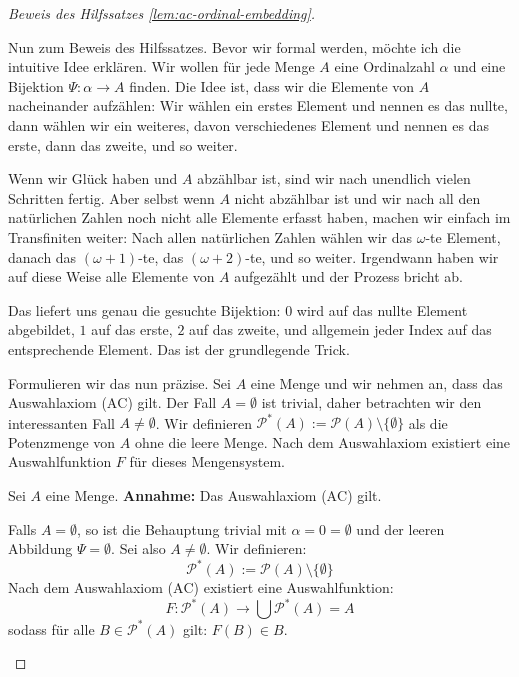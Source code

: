 \begin{proof}[Beweis des Hilfssatzes \ref{lem:ac-ordinal-embedding}]

\begin{spoken-clean}[01:03:41 - 01:05:16]
Nun zum Beweis des Hilfssatzes. Bevor wir formal werden, möchte ich die intuitive Idee erklären. Wir wollen für jede Menge $A$ eine Ordinalzahl $\alpha$ und eine Bijektion $\Psi \colon \alpha \to A$ finden. Die Idee ist, dass wir die Elemente von $A$ nacheinander aufzählen: Wir wählen ein erstes Element und nennen es das nullte, dann wählen wir ein weiteres, davon verschiedenes Element und nennen es das erste, dann das zweite, und so weiter.

Wenn wir Glück haben und $A$ abzählbar ist, sind wir nach unendlich vielen Schritten fertig. Aber selbst wenn $A$ nicht abzählbar ist und wir nach all den natürlichen Zahlen noch nicht alle Elemente erfasst haben, machen wir einfach im Transfiniten weiter: Nach allen natürlichen Zahlen wählen wir das $\omega$-te Element, danach das $(\omega+1)$-te, das $(\omega+2)$-te, und so weiter. Irgendwann haben wir auf diese Weise alle Elemente von $A$ aufgezählt und der Prozess bricht ab.

Das liefert uns genau die gesuchte Bijektion: $0$ wird auf das nullte Element abgebildet, $1$ auf das erste, $2$ auf das zweite, und allgemein jeder Index auf das entsprechende Element. Das ist der grundlegende Trick.

Formulieren wir das nun präzise. Sei $A$ eine Menge und wir nehmen an, dass das Auswahlaxiom ($\text{AC}$) gilt. Der Fall $A = \emptyset$ ist trivial, daher betrachten wir den interessanten Fall $A \neq \emptyset$. Wir definieren $\mathcal{P}^*(A) := \mathcal{P}(A) \setminus \{\emptyset\}$ als die Potenzmenge von $A$ ohne die leere Menge. Nach dem Auswahlaxiom existiert eine Auswahlfunktion $F$ für dieses Mengensystem.
\end{spoken-clean}

\begin{math-stroke}
Sei $A$ eine Menge.
\textbf{Annahme:} Das Auswahlaxiom ($\text{AC}$) gilt.

Falls $A = \emptyset$, so ist die Behauptung trivial mit $\alpha = 0 = \emptyset$ und der leeren Abbildung $\Psi = \emptyset$.
Sei also $A \neq \emptyset$. Wir definieren:
\[
\mathcal{P}^*(A) := \mathcal{P}(A) \setminus \{\emptyset\}
\]
Nach dem Auswahlaxiom ($\text{AC}$) existiert eine Auswahlfunktion:
\[
F \colon \mathcal{P}^*(A) \to \bigcup \mathcal{P}^*(A) = A
\]
sodass für alle $B \in \mathcal{P}^*(A)$ gilt: $F(B) \in B$.
\end{math-stroke}


\end{proof}
